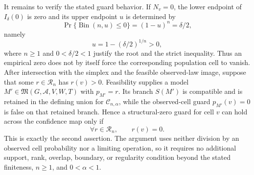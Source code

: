 It remains to verify the stated guard behavior.  If \(N_v=0\), the lower endpoint of \(I_\delta(0)\) is zero and its upper endpoint \(u\) is determined by
\[
 \Pr\{\operatorname{Bin}(n,u)\leq0\}
 =(1-u)^n=\delta/2,
\]
namely
\[
 u=1-(\delta/2)^{1/n}>0,
\]
where \(n\geq1\) and \(0<\delta/2<1\) justify the root and the strict inequality.  Thus an empirical zero does not by itself force the corresponding population cell to vanish.  After intersection with the simplex and the feasible observed-law image, suppose that some \(r\in\mathcal R_n\) has \(r(v)>0\).  Feasibility supplies a model \(M'\in\mathfrak M(G,\mathcal A,V,W,T)\) with \(p_{M'}=r\).  Its branch \(S(M')\) is compatible and is retained in the defining union for \(\mathcal C_{n,\alpha}\), while the observed-cell guard \(p_{M'}(v)=0\) is false on that retained branch.  Hence a structural-zero guard for cell \(v\) can hold across the confidence map only if
\[
 \forall r\in\mathcal R_n,\qquad r(v)=0.
\]
This is exactly the second assertion.  The argument uses neither division by an observed cell probability nor a limiting operation, so it requires no additional support, rank, overlap, boundary, or regularity condition beyond the stated finiteness, \(n\geq1\), and \(0<\alpha<1\).